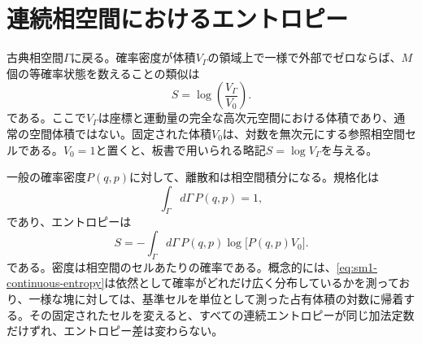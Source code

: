 \begin{classroomqa}
\end{classroomqa}

\begin{classroomqa}
\end{classroomqa}

\section{連続相空間におけるエントロピー}

古典相空間\(\Gamma\)に戻る。確率密度が体積\(V_\Gamma\)の領域上で一様で外部でゼロならば、\(M\)個の等確率状態を数えることの類似は
\begin{equation}
 S=\log\!\left(\frac{V_\Gamma}{V_0}\right).
 \label{eq:sm1-continuous-uniform}
\end{equation}
である。ここで\(V_\Gamma\)は座標と運動量の完全な高次元空間における体積であり、通常の空間体積ではない。固定された体積\(V_0\)は、対数を無次元にする参照相空間セルである。\(V_0=1\)と置くと、板書で用いられる略記\(S=\log V_\Gamma\)を与える。

一般の確率密度\(P(q,p)\)に対して、離散和は相空間積分になる。規格化は
\begin{equation}
 \int_\Gamma d\Gamma\,P(q,p)=1,
 \label{eq:sm1-continuous-normalization}
\end{equation}
であり、エントロピーは
\begin{equation}
 S=-\int_\Gamma d\Gamma\,
 P(q,p)\log\!\bigl[P(q,p)V_0\bigr].
 \label{eq:sm1-continuous-entropy}
\end{equation}
である。密度は相空間のセルあたりの確率である。概念的には、\eqref{eq:sm1-continuous-entropy}は依然として確率がどれだけ広く分布しているかを測っており、一様な塊に対しては、基準セルを単位として測った占有体積の対数に帰着する。その固定されたセルを変えると、すべての連続エントロピーが同じ加法定数だけずれ、エントロピー差は変わらない。

